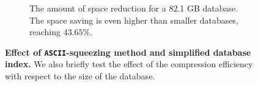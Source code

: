 \begin{figpage}
\begin{figure}
\begin{subfigure}{0.5\textwidth}
      \caption{The amount of space reduction for a 82.1 GB database. The space saving is even higher than smaller databases, reaching $43.65\%$.}
      \label{fig:seqdbsize_large}
    \end{subfigure}
    \caption{\textbf{Effect of \texttt{ASCII}-squeezing method and simplified database index.} We also briefly test the effect of the compression efficiency with respect to the size of the database.}
    \label{fig:ascii-squeezing}
  \end{figure}
  \restoregeometry
\end{figpage}

